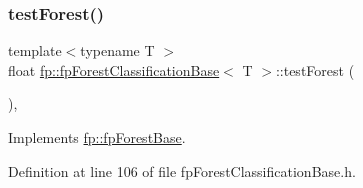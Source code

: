 \subsubsection{\texorpdfstring{test\+Forest()}{testForest()}}
{\footnotesize\ttfamily template$<$typename T $>$ \\
float \hyperlink{classfp_1_1fpForestClassificationBase}{fp\+::fp\+Forest\+Classification\+Base}$<$ T $>$\+::test\+Forest (\begin{DoxyParamCaption}{ }\end{DoxyParamCaption})\hspace{0.3cm}{\ttfamily [inline]}, {\ttfamily [virtual]}}



Implements \hyperlink{classfp_1_1fpForestBase_af7becba028a198f650841b718d16ed16}{fp\+::fp\+Forest\+Base}.



Definition at line 106 of file fp\+Forest\+Classification\+Base.\+h.


